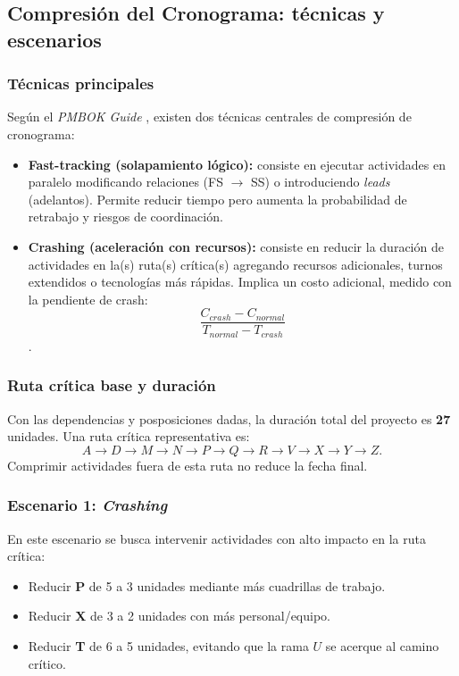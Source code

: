 \subsection{Compresión del Cronograma: técnicas y escenarios}

\subsubsection*{Técnicas principales}

Según el \emph{PMBOK Guide} \cite{PMBOK}, existen dos técnicas centrales de compresión de cronograma:

\begin{itemize}
    \item \textbf{Fast-tracking (solapamiento lógico):} consiste en ejecutar actividades en paralelo modificando relaciones (FS $\rightarrow$ SS) o introduciendo \emph{leads} (adelantos). Permite reducir tiempo pero aumenta la probabilidad de retrabajo y riesgos de coordinación.
    \item \textbf{Crashing (aceleración con recursos):} consiste en reducir la duración de actividades en la(s) ruta(s) crítica(s) agregando recursos adicionales, turnos extendidos o tecnologías más rápidas. Implica un costo adicional, medido con la pendiente de crash: 
    \[
      \frac{C_{crash}-C_{normal}}{T_{normal}-T_{crash}}
    \]
    \cite{Kerzner2017}.
\end{itemize}

\subsubsection*{Ruta crítica base y duración}

Con las dependencias y posposiciones dadas, la duración total del proyecto es \textbf{27} unidades.  
Una ruta crítica representativa es:
\[
A \rightarrow D \rightarrow M \rightarrow N \rightarrow P \rightarrow Q \rightarrow R \rightarrow V \rightarrow X \rightarrow Y \rightarrow Z.
\]
Comprimir actividades fuera de esta ruta no reduce la fecha final.

\subsubsection*{Escenario 1: \emph{Crashing}}

En este escenario se busca intervenir actividades con alto impacto en la ruta crítica:

\begin{itemize}
    \item Reducir \textbf{P} de 5 a 3 unidades mediante más cuadrillas de trabajo.
    \item Reducir \textbf{X} de 3 a 2 unidades con más personal/equipo.
    \item Reducir \textbf{T} de 6 a 5 unidades, evitando que la rama \(U\) se acerque al camino crítico.
\end{itemize}

